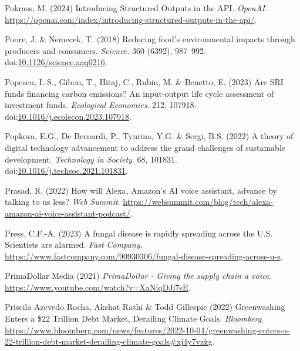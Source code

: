 \documentclass[
  letterpaper,
  DIV=11,
  numbers=noendperiod]{scrartcl}
\newlength{\cslhangindent}
\newenvironment{CSLReferences}[2] %
 {\begin{list}{}{%
  \setlength{\itemindent}{0pt}
  \setlength{\leftmargin}{0pt}
  \setlength{\parsep}{0pt}
  \ifodd #1
   \setlength{\leftmargin}{\cslhangindent}
   \setlength{\itemindent}{-1\cslhangindent}
  \fi
  \setlength{\itemsep}{#2\baselineskip}}}
 {\end{list}}
\begin{document}
\begin{CSLReferences}{0}{1}
Pokrass, M. (2024) Introducing {Structured Outputs} in the {API}.
\emph{OpenAI}.
\url{https://openai.com/index/introducing-structured-outputs-in-the-api/}.

Poore, J. \& Nemecek, T. (2018) Reducing food's environmental impacts
through producers and consumers. \emph{Science}. 360 (6392), 987--992.
doi:\href{https://doi.org/10.1126/science.aaq0216}{10.1126/science.aaq0216}.

Popescu, I.-S., Gibon, T., Hitaj, C., Rubin, M. \& Benetto, E. (2023)
Are {SRI} funds financing carbon emissions? {An} input-output life cycle
assessment of investment funds. \emph{Ecological Economics}. 212,
107918.
doi:\href{https://doi.org/10.1016/j.ecolecon.2023.107918}{10.1016/j.ecolecon.2023.107918}.

Popkova, E.G., De Bernardi, P., Tyurina, Y.G. \& Sergi, B.S. (2022) A
theory of digital technology advancement to address the grand challenges
of sustainable development. \emph{Technology in Society}. 68, 101831.
doi:\href{https://doi.org/10.1016/j.techsoc.2021.101831}{10.1016/j.techsoc.2021.101831}.

Prasad, R. (2022) How will {Alexa}, {Amazon}'s {AI} voice assistant,
advance by talking to us less? \emph{Web Summit}.
\url{https://websummit.com/blog/tech/alexa-amazon-ai-voice-assistant-podcast/}.

Press, C.F.-A. (2023) A fungal disease is rapidly spreading across the
{U}.{S}. {Scientists} are alarmed. \emph{Fast Company}.
\url{https://www.fastcompany.com/90930306/fungal-disease-spreading-across-u-s}.

PrimaDollar Media (2021) \emph{{PrimaDollar} - {Giving} the supply chain
a voice}. \url{https://www.youtube.com/watch?v=XaNiqDJi7sE}.

Priscila Azevedo Rocha, Akshat Rathi \& Todd Gillespie (2022)
Greenwashing {Enters} a \$22 {Trillion Debt Market}, {Derailing Climate
Goals}. \emph{Bloomberg}.
\url{https://www.bloomberg.com/news/features/2022-10-04/greenwashing-enters-a-22-trillion-debt-market-derailing-climate-goals\#xj4y7vzkg}.


\end{CSLReferences}
\end{document}
